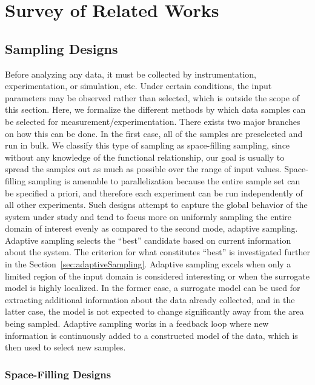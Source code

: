 
\chapter{Survey of Related Works}
\label{ch:related}
\section{Sampling Designs}
\label{sec:sampling}

Before analyzing any data, it must be collected by instrumentation, experimentation, or simulation, etc.
%
Under certain conditions, the input parameters may be observed rather than selected, which is outside the scope of this section.
%
Here, we formalize the different methods by which data samples can be selected for measurement/experimentation.
%
There exists two major branches on how this can be done.
%
In the first case, all of the samples are preselected and run in bulk.
%
We classify this type of sampling as space-filling sampling, since without any knowledge of the functional relationship, our goal is usually to spread the samples out as much as possible over the range of input values.
%
Space-filling sampling is amenable to parallelization because the entire sample set can be specified a priori, and therefore each experiment can be run independently of all other experiments.
%
Such designs attempt to capture the global behavior of the system under study and tend to focus more on uniformly sampling the entire domain of interest evenly as compared to the second mode, adaptive sampling.
%
Adaptive sampling selects the ``best'' candidate based on current information about the system.
%
The criterion for what constitutes ``best'' is investigated further in the Section~\ref{sec:adaptiveSampling}.
%
Adaptive sampling excels when only a limited region of the input domain is considered interesting or when the surrogate model is highly localized.
%
In the former case, a surrogate model can be used for extracting additional information about the data already collected, and in the latter case, the model is not expected to change significantly away from the area being sampled.
%
Adaptive sampling works in a feedback loop where new information is continuously added to a constructed model of the data, which is then used to select new samples.

\subsection{Space-Filling Designs}
\label{sec:forwardSampling}

